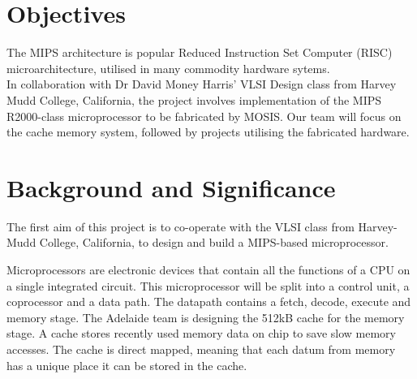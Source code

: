 \documentclass[a4paper,12pt]{article}
\begin{document}
\newpage
\section*{Objectives}
The MIPS architecture is popular Reduced Instruction Set Computer (RISC) microarchitecture, utilised in many commodity hardware sytems.
\\In collaboration with Dr David Money Harris' VLSI Design class from Harvey Mudd College, California, the project involves implementation of the MIPS R2000-class microprocessor to be fabricated by MOSIS. Our team will focus on the cache memory system, followed by projects utilising the fabricated hardware.

\newpage
\tableofcontents

\newpage
\section{Background and Significance}

The first aim of this project is to co-operate with the VLSI class
from Harvey-Mudd College, California, to design and build a MIPS-based
microprocessor.

Microprocessors are electronic devices that contain all the functions
of a CPU on a single integrated circuit. This microprocessor will be
split into a control unit, a coprocessor and a data path. The datapath
contains a fetch, decode, execute and memory stage. The Adelaide team
is designing the 512kB cache for the memory stage. A cache stores
recently used memory data on chip to save slow memory accesses. The
cache is direct mapped, meaning that each datum from memory has a
unique place it can be stored in the cache.
\end{document}
